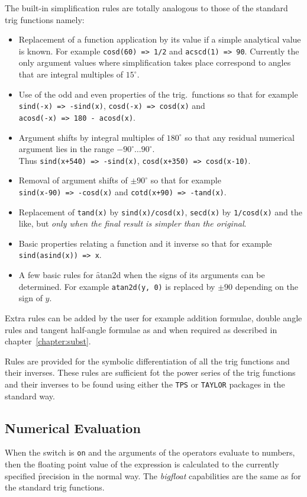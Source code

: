 The built-in simplification rules are totally analogous to those of the standard trig functions namely:
\begin{itemize}
\item  Replacement of a function application by its value if a simple analytical value is known. For example \texttt{cosd(60) => 1/2} and \texttt{acscd(1) => 90}. Currently the only argument values where simplification takes place correspond  to angles that are integral multiples of $15^\circ$.
\item Use of the odd and even properties of the trig.\ functions so that for example 
\texttt{sind(-x) => -sind(x)}, \texttt{cosd(-x) => cosd(x)}  and \\
\texttt{acosd(-x) => 180 - acosd(x)}. 
\item  Argument shifts by integral multiples of $180^\circ$ so that any residual numerical argument  lies in the range $-90^\circ \ldots  90^\circ$.  \\
Thus \texttt{sind(x+540) => -sind(x)}, \texttt{cosd(x+350) => cosd(x-10)}.
\item  Removal of argument shifts of $\pm 90^\circ$ so that for example \\
 \texttt{sind(x-90) => -cosd(x)} and  \texttt{cotd(x+90) => -tand(x)}.
\item Replacement of \texttt{tand(x)} by \texttt{sind(x)/cosd(x)}, \texttt{secd(x)} by \texttt{1/cosd(x)} and the like, but \emph{only when the final result is simpler than the original}.
\item Basic properties relating a function and it inverse so that for example \\
\texttt{sind(asind(x)) => x}.
\item A few basic rules for \f{atan2d} when the signs of its arguments can be determined. For example \texttt{atan2d(y, 0)} is replaced by $\pm 90$ depending on the sign of $y$.
\end{itemize}

Extra rules can be added by the user for example addition formulae, double  angle rules and tangent half-angle formulae as and when required as described in chapter~\ref{chapter:subst}.

Rules are provided for the symbolic differentiation of all the trig  functions and their inverses.  These rules are sufficient fot the power series of the trig functions and their inverses to be found using either the \texttt{TPS} or \texttt{TAYLOR} packages in the standard way.


\subsection{Numerical Evaluation}
When the switch  is \texttt{on} and the arguments of the operators evaluate to numbers, then the floating point value of the expression is calculated to the currently specified \f{precision} in the normal way.  The \textit{bigfloat} capabilities are  the same as for the standard trig functions.   


